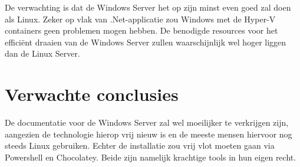 \documentclass[fleqn,10pt]{voorstel}
\begin{document}
	De verwachting is dat de Windows Server het op zijn minst even goed zal doen als Linux. Zeker op vlak van .Net-applicatie zou Windows met de Hyper-V containers geen problemen mogen hebben.
	De benodigde resources voor het efficiënt draaien van de Windows Server zullen waarschijnlijk wel hoger liggen dan de Linux Server.
	
	\section{Verwachte conclusies}
	\label{sec:verwachte_conclusies}
	
	De documentatie voor de Windows Server zal wel moeilijker te verkrijgen zijn, aangezien de technologie hierop vrij nieuw is en de meeste mensen hiervoor nog steeds Linux gebruiken.
	Echter de installatie zou vrij vlot moeten gaan via Powershell en Chocolatey. Beide zijn namelijk krachtige tools in hun eigen recht.
	
	
	\printbibliography[heading=bibintoc]
	
\end{document}
